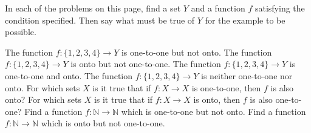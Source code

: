 \documentclass[11pt]{exam}
\def\N{\mathbb{N}}
\begin{document}
In each of the problems on this page, find a set $Y$ and a function $f$ satisfying the condition specified.  Then say what must be true of $Y$ for the example to be possible.

\begin{questions}
\question The function $f: \{1,2,3,4\} \to Y$ is one-to-one but not onto.  
\vfill
\question The function $f: \{1,2,3,4\} \to Y$ is onto but not one-to-one.
\vfill
\question The function $f: \{1,2,3,4\} \to Y$ is one-to-one and onto.
\vfill
\question The function $f: \{1,2,3,4\} \to Y$ is neither one-to-one nor onto.
\vfill
\newpage
{}
\question For which sets $X$ is it true that if $f: X \to X$ is one-to-one, then $f$ is also onto?
\vfill
\question For which sets $X$ is it true that if $f: X \to X$ is onto, then $f$ is also one-to-one?
\vfill
\question Find a function $f:\N \to \N$ which is one-to-one but not onto.
\vfill
\question Find a function $f:\N \to \N$ which is onto but not one-to-one.
\vfill
\end{questions}
\end{document}
